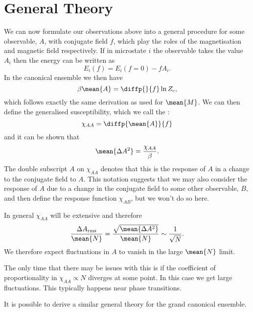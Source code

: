\documentclass[fleqn]{NotesClass}
\newcommand*{\cpartition}{Z_{\mathrm{c}}}
\begin{document}
    \section{General Theory}\label{sec:fluctuations general theory}
    We can now formulate our observations above into a general procedure for some observable, \(A\), with conjugate field \(f\), which play the roles of the magnetisation and magnetic field respectively.
    If in microstate \(i\) the observable takes the value \(A_i\) then the energy can be written as
    \begin{equation}
        E_i(f) = E_i(f = 0) - fA_i.
    \end{equation}
    In the canonical ensemble we then have
    \begin{equation}
        \beta\mean{A} = \diffp{}{f}\ln \cpartition,
    \end{equation}
    which follows exactly the same derivation as used for \(\mean{M}\).
    We can then define the generalised susceptibility, which we call the :
    \begin{equation}
        \chi_{AA} = \diffp{\mean{A}}{f}
    \end{equation}
    and it can be shown that
    \begin{equation}
        \mean{\Delta A^2} = \frac{\chi_{AA}}{\beta}.
    \end{equation}
    The double subscript \(A\) on \(\chi_{AA}\) denotes that this is the response of \(A\) in a change to the conjugate field to \(A\).
    This notation suggests that we may also consider the response of \(A\) due to a change in the conjugate field to some other observable, \(B\), and then define the response function \(\chi_{AB}\), but we won't do so here.
    
    In general \(\chi_{AA}\) will be extensive and therefore
    \begin{equation}
        \frac{\Delta A_{\mathrm{rms}}}{\mean{N}} = \frac{\sqrt{\mean{\Delta A^2}}}{\mean{N}} \sim \frac{1}{\sqrt{N}}.
    \end{equation}
    We therefore expect fluctuations in \(A\) to vanish in the large \(\mean{N}\) limit.
    
    The only time that there may be issues with this is if the coefficient of proportionality in \(\chi_{AA} \propto N\) diverges at some point.
    In this case we get large fluctuations.
    This typically happens near phase transitions.
    
    It is possible to derive a similar general theory for the grand canonical ensemble.
    
\end{document}
